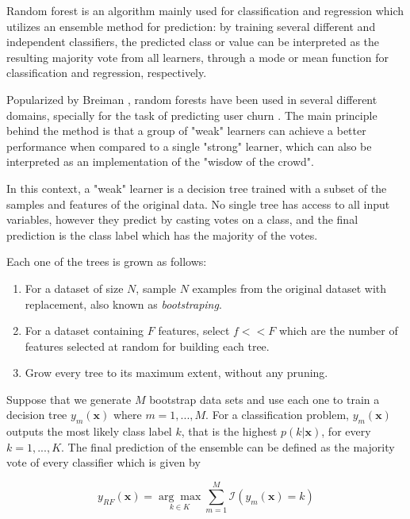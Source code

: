 \documentclass{kththesis}
\begin{document}
Random forest is an algorithm mainly used for classification and regression which utilizes an ensemble method for prediction: by training several different and independent classifiers, the predicted class or value can be interpreted as the resulting majority vote from all learners, through a mode or mean function for classification and regression, respectively.

Popularized by Breiman \citep{breiman2001random}, random forests have been used in several different domains, specially for the task of predicting user churn \citep{coussement2013customer} \citep{burez2008separating}. The main principle behind the method is that a group of "weak" learners can achieve a better performance when compared to a single "strong" learner, which can also be interpreted as an implementation of the "wisdow of the crowd". 

In this context, a "weak" learner is a decision tree trained with a subset of the samples and features of the original data. No single tree has access to all input variables, however they predict by casting votes on a class, and the final prediction is the class label which has the majority of the votes.

Each one of the trees is grown as follows:

\begin{enumerate}
\item For a dataset of size $N$, sample $N$ examples from the original dataset with replacement, also known as \emph{bootstraping}.
\item For a dataset containing $F$ features, select $f<<F$ which are the number of features selected at random for building each tree.
\item Grow every tree to its maximum extent, without any pruning.
\end{enumerate}

Suppose that we generate $M$ bootstrap data sets and use each one to train a decision tree $y_m(\mathbf{x})$ where $m=1,...,M$. For a classification problem, $y_m(\mathbf{x})$ outputs the most likely class label $k$, that is the highest $p(k|\mathbf{x})$, for every $k=1,...,K$. The final prediction of the ensemble can be defined as the majority vote of every classifier which is given by

\begin{equation}
y_\textit{RF}(\mathbf{x}) = \underset{k \in K}{\arg\max} \sum_{m=1}^M \mathcal{I}(y_m(\mathbf{x}) = k)
\end{equation}
\end{document}
